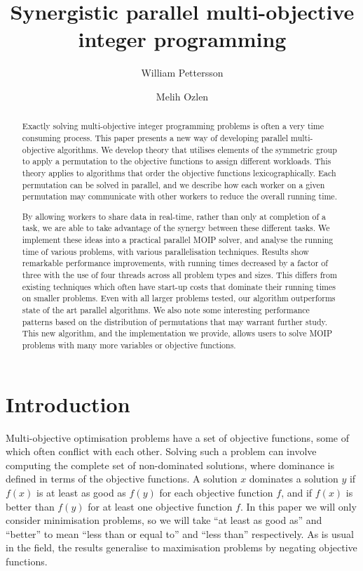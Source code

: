 \documentclass{amsart}
\title{Synergistic parallel multi-objective integer programming}
\author{William Pettersson}
\author{Melih Ozlen}
\theoremstyle{definition}
\begin{document}
\begin{abstract}
  Exactly solving multi-objective integer programming problems is often a very time consuming process.
  This paper presents a new way of developing parallel multi-objective algorithms.
  We develop theory that utilises elements of the symmetric group to apply a permutation to the objective functions to assign different workloads.
  This theory applies to algorithms that order the objective functions lexicographically.
  Each permutation can be solved in parallel, and we describe how each worker on a given permutation may communicate with other workers to reduce the overall running time.
  
  By allowing workers to share data in real-time, rather than only at completion of a task, we are able to take advantage of the synergy between these different tasks.
  We implement these ideas into a practical parallel MOIP solver, and analyse the running time of various problems, with various parallelisation techniques.
  Results show remarkable performance improvements, with running times decreased by a factor of three with the use of four threads across all problem types and sizes.
  This differs from existing techniques which often have start-up costs that dominate their running times on smaller problems.
  Even with all larger problems tested, our algorithm outperforms state of the art parallel algorithms.
  We also note some interesting performance patterns based on the distribution of permutations that may warrant further study.
  This new algorithm, and the implementation we provide, allows users to solve MOIP problems with many more variables or objective functions.
  
\end{abstract}

\maketitle

\section{Introduction}

Multi-objective optimisation problems have a set of objective functions, some of which often conflict with each other.
Solving such a problem can involve computing the complete set of non-dominated solutions, where
dominance is defined in terms of the objective functions.
A solution $x$ dominates a solution $y$ if $f(x)$ is at least as good as $f(y)$ for each objective function $f$, and if $f(x)$ is better than $f(y)$ for at least one objective function $f$.
In this paper we will only consider minimisation problems, so we will take ``at least as good as'' and ``better'' to mean ``less than or equal to'' and ``less than'' respectively.
As is usual in the field, the results generalise to maximisation problems by negating objective functions.
\end{document}

